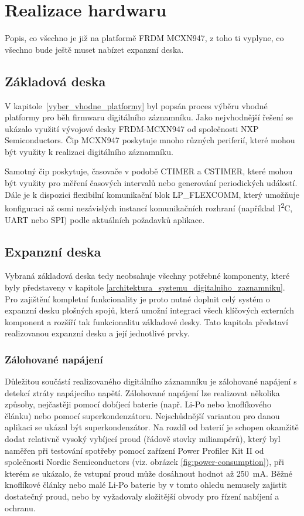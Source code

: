 
\chapter{Realizace hardwaru}
\label{realizace_hardwaru}
Popis, co všechno je již na platformě FRDM MCXN947, z toho ti vyplyne, co všechno bude ještě muset nabízet expanzní deska.

\section{Základová deska} 
V kapitole~\ref{vyber_vhodne_platformy} byl popsán proces výběru vhodné platformy pro běh firmwaru digitálního záznamníku. Jako nejvhodnější řešení se ukázalo využití vývojové desky FRDM-MCXN947 od společnosti NXP Semiconductors. Čip MCXN947 poskytuje mnoho různých periferií, které mohou být využity k realizaci digitálního záznamníku.

Samotný čip poskytuje, časovače v podobě CTIMER a CSTIMER, které mohou být využity pro měření časových intervalů nebo generování periodických událostí. Dále je k dispozici flexibilní komunikační blok LP\_FLEXCOMM, který umožňuje konfiguraci až osmi nezávislých instancí komunikačních rozhraní (například I\textsuperscript{2}C, UART nebo SPI) podle aktuálních požadavků aplikace.

\section{Expanzní deska}
Vybraná základová deska tedy neobsahuje všechny potřebné komponenty, které byly představeny v kapitole \ref{architektura_systemu_digitalniho_zaznamniku}. Pro zajištění kompletní funkcionality je proto nutné doplnit celý systém o expanzní desku plošných spojů, která umožní integraci všech klíčových externích komponent a rozšíří tak funkcionalitu základové desky. Tato kapitola představí realizovanou expanzní desku a její jednotlivé prvky.

\subsection{Zálohované napájení}
Důležitou součástí realizovaného digitálního záznamníku je zálohované napájení s detekcí ztráty napájecího napětí. Zálohované napájení lze realizovat několika způsoby, nejčastěji pomocí dobíjecí baterie (např. Li-Po nebo knoflíkového článku) nebo pomocí superkondenzátoru. Nejschůdnější variantou pro danou aplikaci se ukázal být superkondenzátor. Na rozdíl od baterií je schopen okamžitě dodat relativně vysoký vybíjecí proud (řádově stovky miliampérů), který byl naměřen při testování spotřeby pomocí zařízení Power Profiler Kit II od společnosti Nordic Semiconductors (viz. obrázek \ref{fig:power-consumption}), při kterém se ukázalo, že vstupní proud může dosáhnout hodnot až \SI{250}{\milli\ampere}. Běžné knoflíkové články nebo malé Li-Po baterie by v tomto ohledu nemusely zajistit dostatečný proud, nebo by vyžadovaly složitější obvody pro řízení nabíjení a ochranu. \cite{nordic_semi_ppk2}

